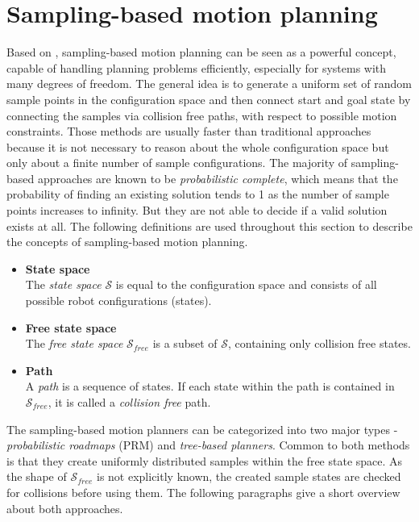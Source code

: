 \section{Sampling-based motion planning}

Based on \citep[chapter 2]{omplPrimer}, sampling-based motion planning can be seen as a powerful concept, capable of handling planning problems efficiently, especially for systems with many degrees of freedom. The general idea is to generate a uniform set of random sample points in the configuration space and then connect start and goal state by connecting the samples via collision free paths, with respect to possible motion constraints. Those methods are usually faster than traditional approaches because it is not necessary to reason about the whole configuration space but only about a finite number of sample configurations. The majority of sampling-based approaches are known to be \emph{probabilistic complete}, which means that the probability of finding an existing solution tends to 1 as the number of sample points increases to infinity. But they are not able to decide if a valid solution exists at all. The following definitions are used throughout this section to describe the concepts of sampling-based motion planning.

\begin{itemize}

\item \textbf{State space} \\
The \emph{state space} $\mathcal{S}$ is equal to the configuration space and consists of all possible robot configurations (states).

\item \textbf{Free state space} \\
The \emph{free state space} $\mathcal{S}_{free}$ is a subset of $\mathcal{S}$, containing only collision free states.  

\item \textbf{Path} \\
A \emph{path} is a sequence of states. If each state within the path is contained in $\mathcal{S}_{free}$, it is called a \emph{collision free} path.  

\end{itemize}

The sampling-based motion planners can be categorized into two major types - \emph{probabilistic roadmaps} (PRM) and \emph{tree-based planners}. Common to both methods is that they create uniformly distributed samples within the free state space. As the shape of $\mathcal{S}_{free}$ is not explicitly known, the created sample states are checked for collisions before using them. The following paragraphs give a short overview about both approaches.

